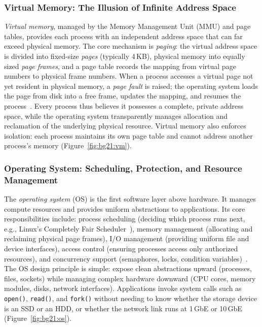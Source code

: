 \subsubsection{Virtual Memory: The Illusion of Infinite Address Space}

\textit{Virtual memory}, managed by the Memory Management Unit (MMU) and page tables, provides each process with an independent address space that can far exceed physical memory.
The core mechanism is \emph{paging}: the virtual address space is divided into fixed-size \emph{pages} (typically 4\,KB), physical memory into equally sized \emph{page frames}, and a page table records the mapping from virtual page numbers to physical frame numbers.
When a process accesses a virtual page not yet resident in physical memory, a \emph{page fault} is raised; the operating system loads the page from disk into a free frame, updates the mapping, and resumes the process~\cite{ostep_2023}.
Every process thus believes it possesses a complete, private address space, while the operating system transparently manages allocation and reclamation of the underlying physical resource.
Virtual memory also enforces isolation: each process maintains its own page table and cannot address another process's memory (Figure~\ref{fig:bg21:vm}).


\subsubsection{Operating System: Scheduling, Protection, and Resource Management}

The \textit{operating system} (OS) is the first software layer above hardware.
It manages compute resources and provides uniform abstractions to applications.
Its core responsibilities include: process scheduling (deciding which process runs next, e.g., Linux's Completely Fair Scheduler~\cite{linux_cfs_2026}), memory management (allocating and reclaiming physical page frames), I/O management (providing uniform file and device interfaces), access control (ensuring processes access only authorized resources), and concurrency support (semaphores, locks, condition variables)~\cite{ostep_2023,xv6_2022}.
The OS design principle is simple: expose clean abstractions upward (processes, files, sockets) while managing complex hardware downward (CPU cores, memory modules, disks, network interfaces).
Applications invoke system calls such as \texttt{open()}, \texttt{read()}, and \texttt{fork()} without needing to know whether the storage device is an SSD or an HDD, or whether the network link runs at 1\,GbE or 10\,GbE (Figure~\ref{fig:bg21:os}).


